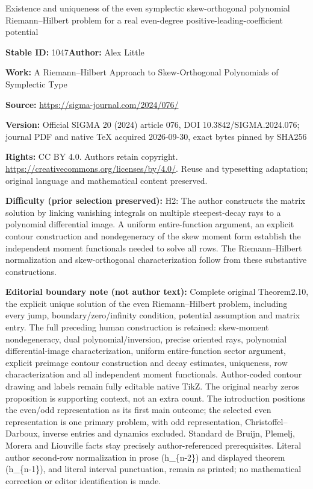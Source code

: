 \documentclass[11pt]{article}
\numberwithin{equation}{section}
\numberwithin{equation}{section}
\begin{document}
\begin{center}\Large Existence and uniqueness of the even symplectic skew-orthogonal polynomial Riemann–Hilbert problem for a real even-degree positive-leading-coefficient potential\end{center}
\noindent\textbf{Stable ID:} 1047\quad\textbf{Author:} Alex Little\par
\noindent\textbf{Work:} A Riemann–Hilbert Approach to Skew-Orthogonal Polynomials of Symplectic Type\par
\noindent\textbf{Source:} \url{https://sigma-journal.com/2024/076/}\par
\noindent\textbf{Version:} Official SIGMA 20 (2024) article 076, DOI 10.3842/SIGMA.2024.076; journal PDF and native TeX acquired 2026-09-30, exact bytes pinned by SHA256\par
\noindent\textbf{Rights:} CC BY 4.0. Authors retain copyright. \url{https://creativecommons.org/licenses/by/4.0/}. Reuse and typesetting adaptation; original language and mathematical content preserved.\par
\noindent\textbf{Difficulty (prior selection preserved):} {\CJKfont H2: The author constructs the matrix solution by linking vanishing integrals on multiple steepest-decay rays to a polynomial differential image. A uniform entire-function argument, an explicit contour construction and nondegeneracy of the skew moment form establish the independent moment functionals needed to solve all rows. The Riemann–Hilbert normalization and skew-orthogonal characterization follow from these substantive constructions.}\par
\medskip\noindent\textbf{Editorial boundary note (not author text):} Complete original Theorem2.10, the explicit unique solution of the even Riemann–Hilbert problem, including every jump, boundary/zero/infinity condition, potential assumption and matrix entry. The full preceding human construction is retained: skew-moment nondegeneracy, dual polynomial/inversion, precise oriented rays, polynomial differential-image characterization, uniform entire-function sector argument, explicit preimage contour construction and decay estimates, uniqueness, row characterization and all independent moment functionals. Author-coded contour drawing and labels remain fully editable native TikZ. The original nearby zeros proposition is supporting context, not an extra count. The introduction positions the even/odd representation as its first main outcome; the selected even representation is one primary problem, with odd representation, Christoffel–Darboux, inverse entries and dynamics excluded. Standard de Bruijn, Plemelj, Morera and Liouville facts stay precisely author-referenced prerequisites. Literal author second-row normalization in prose (h\_\{n-2\}) and displayed theorem (h\_\{n-1\}), and literal interval punctuation, remain as printed; no mathematical correction or editor identification is made.\par
\end{document}
